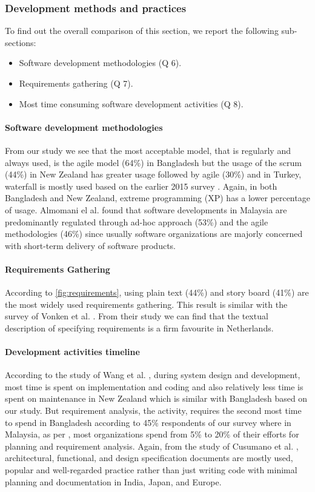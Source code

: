 \subsubsection{Development methods and practices}
\label{dev_methods_comparison}

To find out the overall comparison of this section, we report the following sub-sections:

\begin{itemize}
\item Software development methodologies (Q 6).
\item Requirements gathering (Q 7).
\item Most time consuming software development activities (Q 8).
\end{itemize}


\paragraph{Software development methodologies}
From our study we see that the most acceptable model, that is regularly and always used, is the agile model (64\%) in Bangladesh but the usage of the scrum (44\%) in New Zealand has greater usage followed by agile (30\%) \cite{Wang2018} and in Turkey, waterfall is mostly used based on the earlier 2015 survey \cite{Garousi2015}. Again, in both Bangladesh and New Zealand, extreme programming (XP) has a lower percentage of usage. Almomani el al. \cite{Almomani2015} found that software developments in Malaysia are predominantly regulated through ad-hoc approach (53\%) and the agile methodologies (46\%) since usually software organizations are majorly concerned with short-term delivery of software products.


\paragraph{Requirements Gathering}
According to \ref{fig:requirements}, using plain text (44\%) and story board (41\%) are the most widely used requirements gathering. This result is similar with the survey of Vonken et al. \cite{Vonken2012}. From their study we can find that the textual description of specifying requirements is a firm favourite in Netherlands.


\paragraph{Development activities timeline}
According to the study of Wang et al. \cite{Wang2018}, during system design and development, most time is spent on implementation and coding and also relatively less time is spent on maintenance in New Zealand which is similar with Bangladesh based on our study. But requirement analysis, the activity, requires the second most time to spend in Bangladesh according to 45\% respondents of our survey where in Malaysia, as per \cite{Baharom2006}, most organizations spend from 5\% to 20\% of their efforts for planning and requirement analysis. Again, from the study of Cusumano et al. \cite{Cusumano2003}, architectural, functional, and design specification documents are mostly used, popular and well-regarded practice rather than just writing code with minimal planning and documentation in India, Japan, and Europe.
